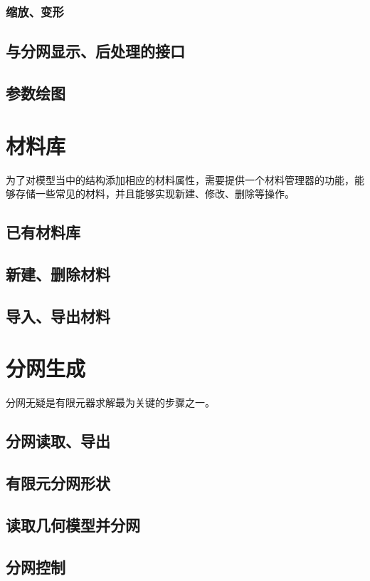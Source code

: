 \subsubsection{缩放、变形}

\subsection{与分网显示、后处理的接口}

\subsection{参数绘图}

\section{材料库}
为了对模型当中的结构添加相应的材料属性，需要提供一个材料管理器的功能，能够存储一些常见的材料，并且能够实现新建、修改、删除等操作。
\subsection{已有材料库}

\subsection{新建、删除材料}

\subsection{导入、导出材料}

\section{分网生成}
分网无疑是有限元器求解最为关键的步骤之一。
\subsection{分网读取、导出}

\subsection{有限元分网形状}

\subsection{读取几何模型并分网}

\subsection{分网控制}

